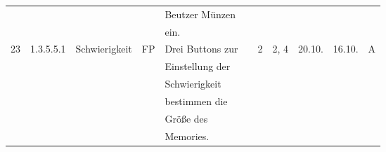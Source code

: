 \begin{longtable}{|c|l|l|c|l|l|c|c|l|l|l|}
            &       &            &    & Beutzer Münzen &   &   & & & &\\
            &       &            &    & ein. &   &   & & & &\\
            \hline
            23 & 1.3.5.5.1 & Schwierigkeit & FP & Drei Buttons zur &  & 2 & 2, 4 & 20.10. & 16.10. & A \\
            &       &            &    & Einstellung der &   &   & & & &\\
            &       &            &    & Schwierigkeit &   &   & & & &\\
            &       &            &    & bestimmen die &   &   & & & &\\
            &       &            &    & Größe des &   &   & & & &\\
            &       &            &    & Memories. &   &   & & & &\\
            \hline
            
    \end{longtable}  
    
